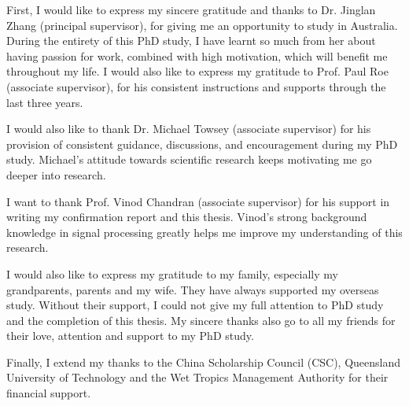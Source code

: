 \begin{ack}
First, I would like to express my sincere gratitude and thanks to Dr. Jinglan Zhang (principal supervisor), for giving me an opportunity to study in Australia. During the entirety of this PhD study, I have learnt so much from her about having passion for work, combined with high motivation, which will benefit me throughout my life. 
I would also like to express my gratitude to Prof. Paul Roe (associate supervisor), for his consistent instructions and supports through the last three years.  

I would also like to thank Dr. Michael Towsey (associate supervisor) for his provision of consistent guidance, discussions, and encouragement during my PhD study. Michael's attitude towards scientific research keeps motivating me go deeper into research.  


I want to thank Prof. Vinod Chandran (associate supervisor) for his support in writing my confirmation report and this thesis. Vinod's strong background knowledge in signal processing greatly helps me improve my understanding of this research.

I would also like to express my gratitude to my family, especially my grandparents, parents and my wife. They have always supported my overseas study. Without their support, I could not give my full attention to PhD study and  the completion of this thesis. 
My sincere thanks also go to all my friends for their love, attention and support to my PhD study. 

Finally, I extend my thanks to the China Scholarship Council (CSC), Queensland University of Technology and the Wet Tropics Management Authority for their financial support. 

\end{ack}





\afterpreface
